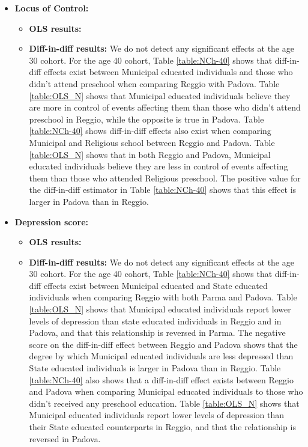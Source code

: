 \documentclass[11pt]{article}
\begin{document}
\begin{itemize}
\item \textbf{Locus of Control:} 
	
	\begin{itemize}
	\item \textbf{OLS results:} 

	\item \textbf{Diff-in-diff results:} We do not detect any significant effects at the age 30 cohort. For the age 40 cohort, Table \ref{table:NCh-40} shows that diff-in-diff effects exist between Municipal educated individuals and those who didn't attend preschool when comparing Reggio with Padova. Table \ref{table:OLS_N} shows that Municipal educated individuals believe they are more in control of events affecting them than those who didn't attend preschool in Reggio, while the opposite is true in Padova. Table \ref{table:NCh-40} shows diff-in-diff effects also exist when comparing Municipal and Religious school between Reggio and Padova.  Table \ref{table:OLS_N} shows that in both Reggio and Padova, Municipal educated individuals believe they are less in control of events affecting them than those who attended Religious preschool. The positive value for the diff-in-diff estimator in Table \ref{table:NCh-40} shows that this effect is larger in Padova than in Reggio.
	\end{itemize}

\item \textbf{Depression score:} 
	
	\begin{itemize}
	\item \textbf{OLS results:} 
	
	\item \textbf{Diff-in-diff results:} We do not detect any significant effects at the age 30 cohort. For the age 40 cohort, Table \ref{table:NCh-40} shows that diff-in-diff effects exist between Municipal educated and State educated individuals when comparing Reggio with both Parma and Padova. Table \ref{table:OLS_N} shows that Municipal educated individuals report lower levels of depression than state educated individuals in Reggio and in Padova, and that this relationship is reversed in Parma. The negative score on the diff-in-diff effect between Reggio and Padova shows that the degree by which Municipal educated individuals are less depressed than State educated individuals is larger in Padova than in Reggio. Table \ref{table:NCh-40} also shows that a diff-in-diff effect exists between Reggio and Padova when comparing Municipal educated individuals to those who didn't received any preschool education. Table \ref{table:OLS_N} shows that Municipal educated individuals report lower levels of depression than their State educated counterparts in Reggio, and that the relationship is reversed in Padova. 
	\end{itemize}


\end{itemize}
\end{document}
